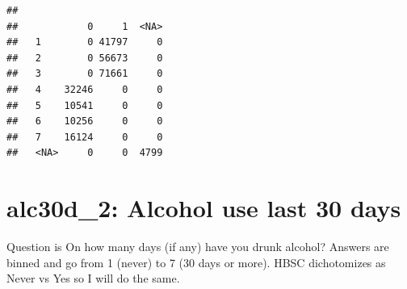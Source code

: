 \documentclass[
]{article}
\newenvironment{Shaded}{\begin{snugshade}}{\end{snugshade}}
\newcommand{\AttributeTok}[1]{\textcolor[rgb]{0.13,0.29,0.53}{#1}}
\newcommand{\ConstantTok}[1]{\textcolor[rgb]{0.56,0.35,0.01}{#1}}
\newcommand{\DecValTok}[1]{\textcolor[rgb]{0.00,0.00,0.81}{#1}}
\newcommand{\FunctionTok}[1]{\textcolor[rgb]{0.13,0.29,0.53}{\textbf{#1}}}
\newcommand{\NormalTok}[1]{#1}
\newcommand{\OtherTok}[1]{\textcolor[rgb]{0.56,0.35,0.01}{#1}}
\newcommand{\SpecialCharTok}[1]{\textcolor[rgb]{0.81,0.36,0.00}{\textbf{#1}}}
\newcommand{\StringTok}[1]{\textcolor[rgb]{0.31,0.60,0.02}{#1}}
\begin{document}
\begin{Shaded}
\end{Shaded}

\begin{verbatim}
##       
##            0     1  <NA>
##   1        0 41797     0
##   2        0 56673     0
##   3        0 71661     0
##   4    32246     0     0
##   5    10541     0     0
##   6    10256     0     0
##   7    16124     0     0
##   <NA>     0     0  4799
\end{verbatim}

\section{alc30d\_2: Alcohol use last 30
days}\label{alc30d_2-alcohol-use-last-30-days}

Question is On how many days (if any) have you drunk alcohol? Answers
are binned and go from 1 (never) to 7 (30 days or more). HBSC
dichotomizes as Never vs Yes so I will do the same.

\begin{Shaded}
\end{Shaded}
\end{document}
